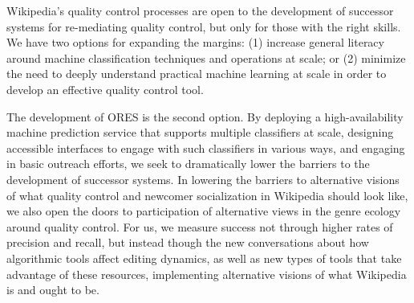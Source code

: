Wikipedia's quality control processes are open to the development of successor systems for re-mediating quality control, but only for those with the right skills. We have two options for expanding the margins: (1) increase general literacy around machine classification techniques and operations at scale; or (2) minimize the need to deeply understand practical machine learning at scale in order to develop an effective quality control tool.

The development of ORES is the second option.  By deploying a high-availability machine prediction service that supports multiple classifiers at scale, designing accessible interfaces to engage with such classifiers in various ways, and engaging in basic outreach efforts, we seek to dramatically lower the barriers to the development of successor systems. In lowering the barriers to alternative visions of what quality control and newcomer socialization in Wikipedia should look like, we also open the doors to participation of alternative views in the genre ecology around quality control.  For us, we measure success not through higher rates of precision and recall, but instead though the new conversations about how algorithmic tools affect editing dynamics, as well as new types of tools that take advantage of these resources, implementing alternative visions of what Wikipedia is and ought to be.
